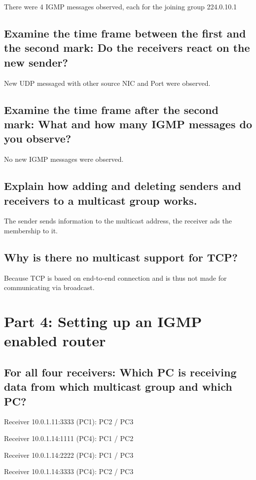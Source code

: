 \documentclass[a4paper, 11pt]{article}
\begin{document}
There were 4 IGMP messages observed, each for the joining group 224.0.10.1

\subsection {Examine the time frame between the first and the second mark: Do the receivers react on the new sender? }

New UDP messaged with other source NIC and Port were observed.

\subsection {Examine the time frame after the second mark: What and how many IGMP messages do you observe?}

No new IGMP messages were observed.

\subsection {Explain how adding and deleting senders and receivers to a multicast group works. }

The sender sends information to the multicast address, the receiver ads the membership to it.

\subsection {Why is there no multicast support for TCP? }

Because TCP is based on end-to-end connection and is thus not made for communicating via broadcast.

\section{Part 4: Setting up an IGMP enabled router}

\subsection {For all four receivers: Which PC is receiving data from which multicast group and which PC?}


Receiver 10.0.1.11:3333 (PC1): PC2 / PC3

Receiver 10.0.1.14:1111 (PC4): PC1 / PC2

Receiver 10.0.1.14:2222 (PC4): PC1 / PC3

Receiver 10.0.1.14:3333 (PC4): PC2 / PC3
\end{document}
